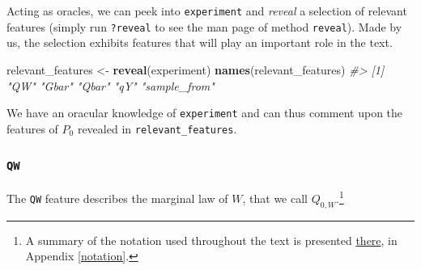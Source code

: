 \documentclass[11pt,openright,twoside]{book}
\newenvironment{Shaded}{\begin{snugshade}}{\end{snugshade}}
\newcommand{\CommentTok}[1]{\textcolor[rgb]{0.56,0.35,0.01}{\textit{#1}}}
\newcommand{\KeywordTok}[1]{\textcolor[rgb]{0.13,0.29,0.53}{\textbf{#1}}}
\newcommand{\NormalTok}[1]{#1}
\newcommand{\OperatorTok}[1]{\textcolor[rgb]{0.81,0.36,0.00}{\textbf{#1}}}
\newcommand{\StringTok}[1]{\textcolor[rgb]{0.31,0.60,0.02}{#1}}
\theoremstyle{definition}
\theoremstyle{definition}
\theoremstyle{definition}
\theoremstyle{remark}
\begin{document}
Acting as oracles, we can peek into \texttt{experiment} and \emph{reveal} a selection of
relevant features (simply run \texttt{?reveal} to see the man page of method
\texttt{reveal}). Made by us, the selection exhibits features that will play an
important role in the text.

\begin{Shaded}
\begin{Highlighting}[]
\NormalTok{relevant_features <-}\StringTok{ }\KeywordTok{reveal}\NormalTok{(experiment)}
\KeywordTok{names}\NormalTok{(relevant_features)}
\CommentTok{#> [1] "QW"          "Gbar"        "Qbar"        "qY"          "sample_from"}
\end{Highlighting}
\end{Shaded}

We have an oracular knowledge of \texttt{experiment} and can thus comment upon the
features of \(P_{0}\) revealed in \texttt{relevant\_features}.

\hypertarget{qw}{%
\subsubsection*{\texorpdfstring{\texttt{QW}}{QW}}\label{qw}}

The \texttt{QW} feature describes the marginal law of \(W\), that we call \(Q_{0,W}\).\footnote{A
  summary of the notation used throughout the text is presented
  \protect\hyperlink{notation}{there}, in Appendix \ref{notation}.}

\begin{Shaded}
\end{Shaded}
\end{document}
